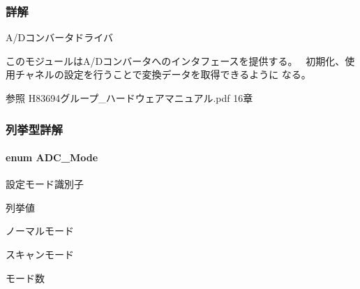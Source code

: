\subsubsection{詳解}
A/\+Dコンバータドライバ 

このモジュールは\+A/\+Dコンバータへのインタフェースを提供する。~\newline
初期化、使用チャネルの設定を行うことで変換データを取得できるように なる。

\begin{DoxySeeAlso}{参照}
H83694グループ\+\_\+ハードウェアマニュアル.\+pdf 16章
\end{DoxySeeAlso}
 

\subsubsection{列挙型詳解}
\paragraph[{A\+D\+C\+\_\+\+Mode}]{\setlength{\rightskip}{0pt plus 5cm}enum {\bf A\+D\+C\+\_\+\+Mode}}\label{adc_8h_a184c6673e1a242cded56d57b9600e591_a184c6673e1a242cded56d57b9600e591}


設定モード識別子 

\begin{Desc}
\item[列挙値]\par
\begin{description}
\item[{\em 
A\+D\+C\+\_\+\+N\+O\+R\+M\+A\+L\label{adc_8h_a184c6673e1a242cded56d57b9600e591_a184c6673e1a242cded56d57b9600e591ae58688800227d2e53c5c826f175d0676}
}]ノーマルモード \item[{\em 
A\+D\+C\+\_\+\+S\+C\+A\+N\label{adc_8h_a184c6673e1a242cded56d57b9600e591_a184c6673e1a242cded56d57b9600e591ac421996f600e6f84ea8a08b3c89bda41}
}]スキャンモード \item[{\em 
A\+D\+C\+\_\+\+N\+U\+M\+\_\+\+O\+F\+\_\+\+M\+O\+D\+E\label{adc_8h_a184c6673e1a242cded56d57b9600e591_a184c6673e1a242cded56d57b9600e591aec9562b03bab4f1d385bf577c4a50940}
}]モード数 \end{description}
\end{Desc}


